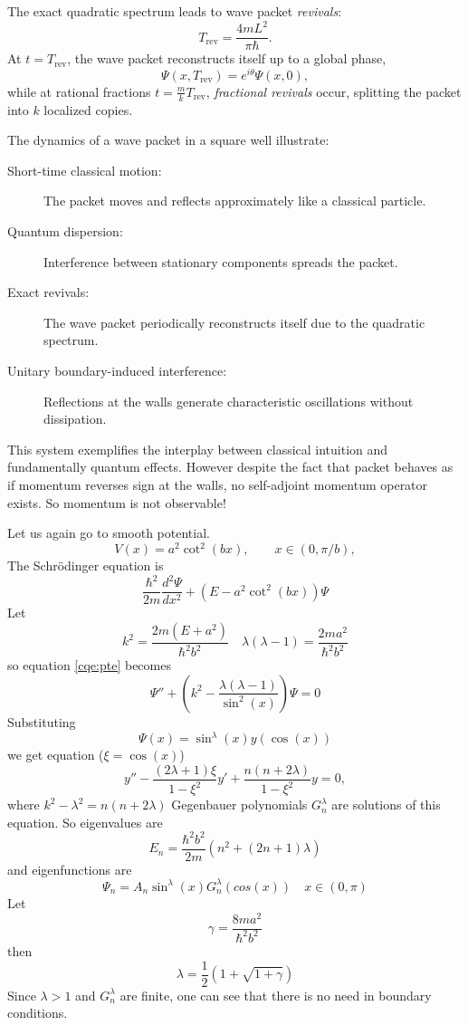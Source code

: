The exact quadratic spectrum leads to wave packet \emph{revivals}:
\begin{equation}
T_{\mathrm{rev}} = \frac{4 m L^2}{\pi \hbar}.
\end{equation}
At $t = T_{\mathrm{rev}}$, the wave packet reconstructs itself up to a global phase,
\begin{equation}
\Psi(x,T_{\mathrm{rev}}) = e^{i \theta} \Psi(x,0),
\end{equation}
while at rational fractions $t = \frac{m}{k} T_{\mathrm{rev}}$, \emph{fractional revivals} occur, splitting the packet into $k$ localized copies.


The dynamics of a wave packet in a square well illustrate:
\begin{description}
    \item [Short-time classical motion:] The packet moves and reflects approximately like a classical particle.
    \item [Quantum dispersion:] Interference between stationary components spreads the packet.
    \item [Exact revivals:] The wave packet periodically reconstructs itself due to the quadratic spectrum.
    \item [Unitary boundary-induced interference:] Reflections at the walls generate characteristic oscillations without dissipation.
\end{description}
This system exemplifies the interplay between classical intuition and fundamentally quantum effects.
However despite the fact that packet behaves as if momentum reverses sign at the walls,
no self-adjoint momentum operator exists. So momentum is not observable!

Let us again go to smooth potential.
\[
    V(x)=a^2\cot^2(bx), \qquad x\in(0,\pi/b),
\]
The Schr\"odinger equation is 
\begin{equation}
    \label{cqe:pte}
    \frac{\hbar^2}{2m}\frac{d^2 \Psi}{dx^2}+(E-a^2\cot^2(bx))\Psi
\end{equation}
Let 
\[ k^2=\frac{2 m (E+a^2)}{\hbar^2 b^2} \quad 
\lambda(\lambda-1)=\frac{2 m a^2}{\hbar^2 b^2}
\]
so equation \eqref{cqe:pte} becomes
\[ \Psi''+(k^2-\frac{\lambda (\lambda-1)}{\sin^2(x)}) \Psi=0 \]
Substituting \[ \Psi(x)=\sin^\lambda(x) y(\cos(x)) \] we get
equation ($ \xi=\cos(x) $)
\[ y''-\frac{(2 \lambda+1)\xi}{1-\xi^2} y' +\frac{n(n+2 \lambda)}{1-\xi^2}y=0 , \] where $ k^2-\lambda^2=n(n+2 \lambda) $
Gegenbauer polynomials $G^\lambda_n$ are solutions of this equation.
So eigenvalues are 
\begin{equation}
   \label {cqe:ptev}
   E_n=\frac{\hbar ^2 b^2}{2 m}(n^2+(2 n+1) \lambda)
\end{equation}
and eigenfunctions are 
\begin{equation}
   \label {cqe:ptef}
    \Psi_n=A_n \sin^\lambda(x) G^\lambda_n(cos(x)) \quad x\in (0,\pi)
\end{equation}
Let \[ \gamma=\frac{8 m a^2}{\hbar^2 b^2} \] then \[ 
\lambda=\frac{1}{2} (1+\sqrt{1+\gamma})\]
Since $ \lambda>1 $ and $ G^\lambda_n $ are finite, one can see that there is no need in boundary conditions.

